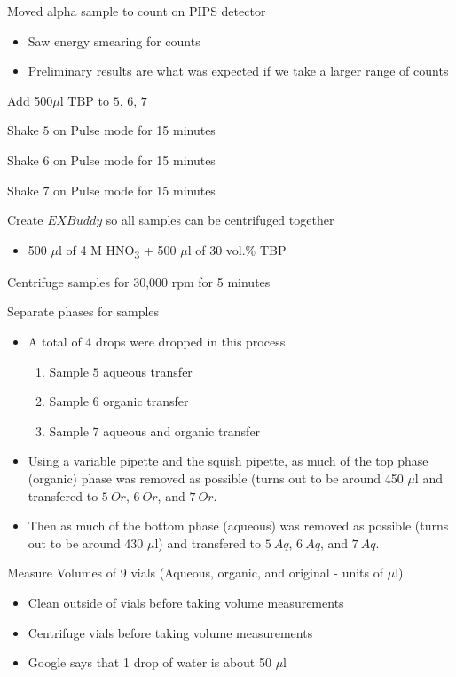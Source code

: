\documentclass[idxtotoc,hyperref,openany,oneside]{labbook} %
\newcommand{\cmark}{\ding{51}}%
\newcommand{\done}{\rlap{$\square$}{\raisebox{2pt}{\large\hspace{1pt}\cmark}}%
  \hspace{-2.5pt}}
\newcommand{\tsbs}{\textsubscript}
\begin{document}
\begin{todolist}
\item[\done]{Moved alpha sample to count on PIPS detector}
  \begin{itemize}
  \item{Saw energy smearing for counts}
  \item{Preliminary results are what was expected if
    we take a larger range of counts}
  \end{itemize}
\end{todolist}


\begin{todolist}
\item[\done]{Add 500$\mu$l TBP to $\boxed{5}$, $\boxed{6}$,
  $\boxed{7}$}
\item[\done]{Shake $\boxed{5}$ on Pulse mode for 15 minutes}
\item[\done]{Shake $\boxed{6}$ on Pulse mode for 15 minutes}
\item[\done]{Shake $\boxed{7}$ on Pulse mode for 15 minutes}
\item[\done]{Create $\boxed{EX Buddy}$ so all samples can be
  centrifuged together}
  \begin{itemize}
  \item{500 $\mu$l of 4 M HNO\tsbs{3} + 500 $\mu$l of 30 vol.\%
    TBP}
  \end{itemize}
\item[\done]{Centrifuge samples for 30,000 rpm for 5 minutes}
\item[\done]{Separate phases for samples}
  \begin{itemize}
  \item{A total of 4 drops were dropped in this process}
    \begin{enumerate}
    \item{Sample $\boxed{5}$ aqueous transfer}
    \item{Sample $\boxed{6}$ organic transfer}
    \item{Sample $\boxed{7}$ aqueous and organic transfer}
    \end{enumerate}
  \item{Using a variable pipette and the squish pipette,
    as much of the top phase (organic) phase was removed as possible
    (turns out to be around 450 $\mu$l and transfered to
    $\boxed{5\ Or}$, $\boxed{6\ Or}$, and $\boxed{7\ Or}$.}
  \item{Then as much of the bottom phase (aqueous) was removed as
    possible (turns out to be around 430 $\mu$l) and transfered
    to $\boxed{5\ Aq}$, $\boxed{6\ Aq}$, and $\boxed{7\ Aq}$.}
  \end{itemize}
\item[\done]{Measure Volumes of 9 vials (Aqueous, organic, and original
  - units of $\mu$l)}
  \begin{itemize}
  \item{Clean outside of vials before taking volume measurements}
  \item{Centrifuge vials before taking volume measurements}
  \item{Google says that 1 drop of water is about 50 $\mu$l}
  \end{itemize}
\end{todolist}
\end{document}
